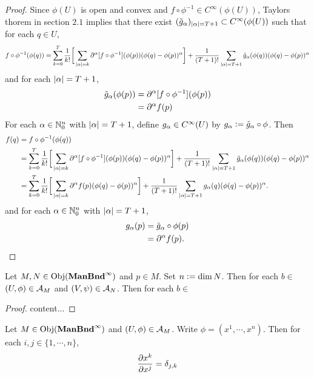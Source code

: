 \documentclass{book}
\begin{document}
\begin{proof}
	Since $\phi(U)$ is open and convex and $f \circ \phi^{-1} \in C^{\infty}(\phi(U))$, Taylors thorem in section $2.1$ implies that there exist $(\tilde{g}_{\alpha})_{|\alpha| = T+1} \subset C^{\infty}(\phi(U))$ such that for each $q \in U$, 
	$$f \circ \phi^{-1} (\phi(q)) = \sum_{k=0}^{T} \frac{1}{k!} \bigg[\sum_{|\alpha| = k}\partial^{\alpha} [f \circ \phi^{-1}] (\phi(p)) (\phi(q) - \phi(p))^{\alpha}  \bigg] + \frac{1}{(T+1)!}\sum_{|\alpha| = T+1} \tilde{g}_{\alpha}(\phi(q)) (\phi(q) - \phi(p))^{\alpha}  $$	
	and for each $|\alpha|= T+1$, 
	\begin{align*}
		\tilde{g}_{\alpha}(\phi(p)) 
		&= \partial^{\alpha} [f \circ \phi^{-1}](\phi(p)) \\
		&= \partial^{\alpha} f (p)
	\end{align*}
	For each $\alpha \in \mathbb{N}_0^n$ with $|\alpha| = T+1$, define $g_{\alpha} \in C^{\infty}(U)$ by $g_{\alpha} \vcentcolon= \tilde{g}_{\alpha} \circ \phi$. Then 
	\begin{align*}
		f(q) 
		& = f \circ \phi^{-1} (\phi(q)) \\
		& = \sum_{k=0}^{T} \frac{1}{k!} \bigg[\sum_{|\alpha| = k} \partial^{\alpha} [f \circ \phi^{-1}] (\phi(p)) (\phi(q) - \phi(p))^{\alpha}  \bigg] + \frac{1}{(T+1)!} \sum_{|\alpha| = T+1} \tilde{g}_{\alpha}(\phi(q)) (\phi(q) - \phi(p))^{\alpha} \\
		& = \sum_{k=0}^{T} \frac{1}{k!} \bigg[\sum_{|\alpha| = k} \partial^{\alpha} f(p) (\phi(q) - \phi(p))^{\alpha} \bigg] + \frac{1}{(T+1)!} \sum_{|\alpha| = T+1} g_{\alpha}(q) (\phi(q) - \phi(p))^{\alpha}.
	\end{align*}			
	and for each $\alpha \in \mathbb{N}_0^n$ with $|\alpha| = T+1$, 
	\begin{align*}
		g_{\alpha}(p) 
		 & = \tilde{g}_{\alpha} \circ \phi(p) \\
		 & = \partial^{\alpha} f(p).
	\end{align*}
\end{proof}

\begin{ex} 
	Let $M, N \in \operatorname{Obj}(\operatorname*{\text{\textbf{ManBnd}}^{\infty}})$ and $p \in M$. Set $n \vcentcolon= \dim N$. Then for each $b \in $ $(U, \phi) \in \mathcal{A}_M$ and $(V, \psi) \in \mathcal{A}_N$. Then for each $b \in $  
\end{ex}

\begin{proof}
	content...
\end{proof}


\begin{ex} 
	Let $M \in \operatorname{Obj}(\operatorname*{\text{\textbf{ManBnd}}^{\infty}})$ and $(U, \phi) \in \mathcal{A}_M$. Write $\phi = (x^1, \cdots, x^n)$. Then for each $i,j \in \{1, \cdots, n\}$,  
	$$\frac{\partial x^k}{\partial x^j} = \delta_{j,k}$$
\end{ex}
\end{document}
